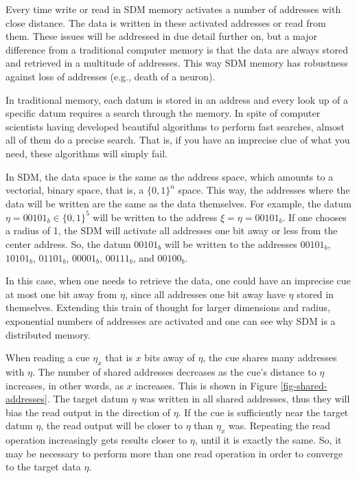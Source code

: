 Every time write or read in SDM memory activates a number of addresses with close distance.  The data is written in these activated addresses or read from them.  These issues will be addressed in due detail further on, but a major difference from a traditional computer memory is that the data are always stored and retrieved in a multitude of addresses. This way SDM memory has robustness against loss of addresses (e.g., death of a neuron).

In traditional memory, each datum is stored in an address and every look up of a specific datum requires a search through the memory. In spite of computer scientists having developed beautiful algorithms to perform fast searches, almost all of them do a precise search. That is, if you have an imprecise clue of what you need, these algorithms will simply fail.

In SDM, the data space is the same as the address space, which amounts to a vectorial, binary space, that is, a $\{0,1\}^{n}$ space. This way, the addresses where the data will be written are the same as the data themselves. For example, the datum $\eta=00101_{b}\in\{0,1\}^{5}$ will be written to the address $\xi=\eta=00101_{b}$. If one chooses a radius of 1, the SDM will activate all addresses one bit away or less from the center address. So, the datum $00101_{b}$ will be written to the addresses $00101_{b}$, $10101_{b}$, $01101_{b}$, $00001_{b}$, $00111_{b}$, and $00100_{b}$.

In this case, when one needs to retrieve the data, one could have an imprecise cue at most one bit away from $\eta$, since all addresses one bit away have $\eta$ stored in themselves.  Extending this train of thought for larger dimensions and radius, exponential numbers of addresses are activated and one can see why SDM is a distributed memory.

When reading a cue $\eta_{x}$ that is $x$ bits away of $\eta$, the cue shares many addresses with $\eta$. The number of shared addresses decreases as the cue's distance to $\eta$ increases, in other words, as $x$ increases. This is shown in Figure \ref{fig-shared-addresses}.  The target datum $\eta$ was written in all shared addresses, thus they will bias the read output in the direction of $\eta$. If the cue is sufficiently near the target datum $\eta$, the read output will be closer to $\eta$ than $\eta_{x}$ was. Repeating the read operation increasingly gets results closer to $\eta$, until it is exactly the same. So, it may be necessary to perform more than one read operation in order to converge to the target data $\eta$.

